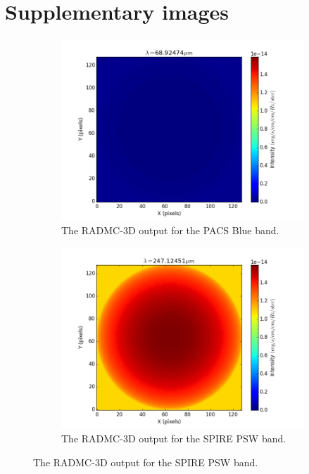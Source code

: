 \documentclass{report}
\begin{document}
\section*{Supplementary images}
\begin{figure}
\centering

\begin{subfigure}[b]{.45\linewidth}
\includegraphics[width=\linewidth]{../img/output/blue.png}
\caption{The RADMC-3D output for the PACS Blue band.}\label{fig:isoblue}
\end{subfigure}
\begin{subfigure}[b]{.45\linewidth}
\includegraphics[width=\linewidth]{../img/output/psw.png}
\caption{The RADMC-3D output for the SPIRE PSW band.}\label{fig:isopsw}
\end{subfigure}


\end{figure}
\end{document}
